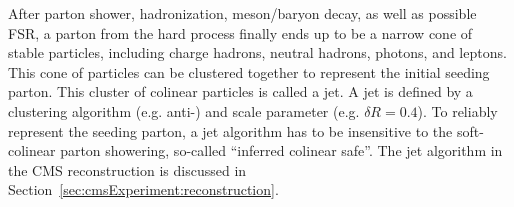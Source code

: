 After parton shower, hadronization, meson/baryon decay, as well as possible FSR, a parton from the hard process finally ends up to be a narrow cone of stable particles, including charge hadrons, neutral hadrons, photons, and leptons. This cone of particles can be clustered together to represent the initial seeding parton. This cluster of colinear particles is called a jet. A jet is defined by a clustering algorithm (e.g. anti-\kt) and scale parameter (e.g. $\delta R=0.4$). To reliably represent the seeding parton, a jet algorithm has to be insensitive to the soft-colinear parton showering, so-called ``inferred colinear safe''. The jet algorithm in the CMS reconstruction is discussed in Section~\ref{sec:cmsExperiment:reconstruction}.

